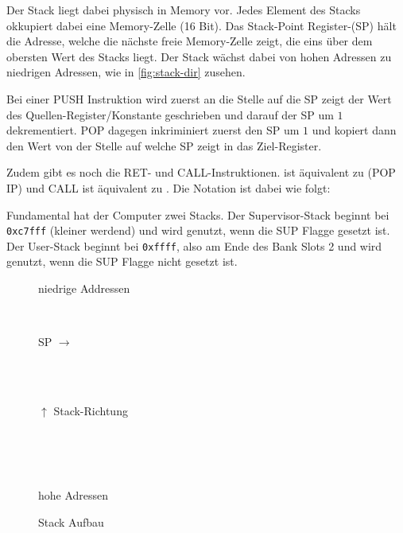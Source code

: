 \documentclass{scrartcl}
\begin{document}

Der Stack liegt dabei physisch in Memory vor.
Jedes Element des Stacks okkupiert dabei eine Memory-Zelle (16 Bit).
Das Stack-Point Register-(SP) hält die Adresse, welche die nächste freie Memory-Zelle zeigt, die eins über dem obersten Wert des Stacks liegt.
Der Stack wächst dabei von hohen Adressen zu niedrigen Adressen, wie in \autoref{fig:stack-dir} zusehen.

Bei einer PUSH Instruktion wird zuerst an die Stelle auf die SP zeigt der Wert des Quellen-Register/Konstante geschrieben und darauf der SP um $1$ dekrementiert.
POP dagegen inkriminiert zuerst den SP um $1$ und kopiert dann den Wert von der Stelle auf welche SP zeigt in das Ziel-Register.

Zudem gibt es noch die RET- und CALL-Instruktionen.  ist äquivalent zu \text(POP IP) und CALL ist äquivalent zu .
Die Notation ist dabei wie folgt:



Fundamental hat der Computer zwei Stacks.
Der Supervisor-Stack beginnt bei \texttt{0xc7fff} (kleiner werdend) und wird genutzt, wenn die SUP Flagge gesetzt ist.
Der User-Stack beginnt bei \texttt{0xffff}, also am Ende des Bank Slots 2 und wird genutzt, wenn die SUP Flagge nicht gesetzt ist.

\begin{figure}[h]
	\centering
	\caption{Stack Aufbau}
	\label{fig:stack-dir}

	\begin{bytefield}[leftcurly=., rightcurly=.]{16}
		\begin{rightwordgroup}{\small niedrige Addressen}
		\end{rightwordgroup} \\
		\begin{leftwordgroup}{\small SP $\rightarrow$}
		\end{leftwordgroup} \\
		 \\
		\begin{rightwordgroup}{\small $\uparrow$ Stack-Richtung}
		\end{rightwordgroup} \\
		 \\
		 \\
		\begin{rightwordgroup}{\small hohe Adressen}
		\end{rightwordgroup}
	\end{bytefield}

\end{figure}
\end{document}
